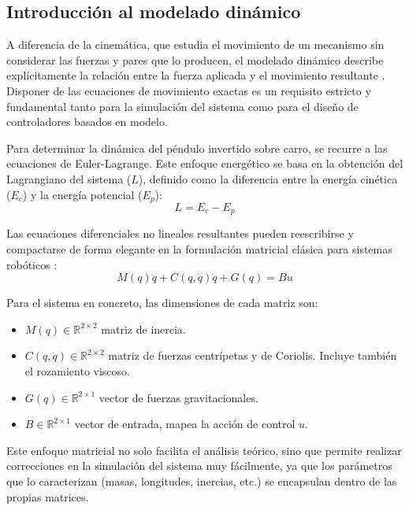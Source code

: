 \documentclass[11pt,fleqn]{book} %
\begin{document}
\subsection{Introducción al modelado dinámico}

A diferencia de la cinemática, que estudia el movimiento de un mecanismo sin considerar las fuerzas y pares que lo producen, el modelado dinámico describe explícitamente la relación entre la fuerza aplicada y el movimiento resultante \cite{spong2006robot}. Disponer de las ecuaciones de movimiento exactas es un requisito estricto y fundamental tanto para la simulación del sistema como para el diseño de controladores basados en modelo. 

Para determinar la dinámica del péndulo invertido sobre carro, se recurre a las ecuaciones de Euler-Lagrange. Este enfoque energético se basa en la obtención del Lagrangiano del sistema ($L$), definido como la diferencia entre la energía cinética ($E_c$) y la energía potencial ($E_p$):
\begin{equation}
		L = E_c - E_p
	\label{eq:lagrangiano}
\end{equation}

Las ecuaciones diferenciales no lineales resultantes pueden reescribirse y compactarse de forma elegante en la formulación matricial clásica para sistemas robóticos \cite{murray1994mathematical}:
\begin{equation}
		M(q)\ddot{q} + C(q,\dot{q})\dot{q} + G(q) = B u
	\label{eq:matrices_dinamica}
\end{equation}

Para el sistema en concreto, las dimensiones de cada matriz son:
\begin{itemize}
	\item $M(q) \in \mathbb{R}^{2 \times 2}$ matriz de inercia.
	\item $C(q,\dot{q}) \in \mathbb{R}^{2 \times 2}$ matriz de fuerzas centrípetas y de Coriolis. Incluye también el rozamiento viscoso.
	\item $G(q) \in \mathbb{R}^{2 \times 1}$ vector de fuerzas gravitacionales.
	\item $B \in \mathbb{R}^{2 \times 1}$ vector de entrada, mapea la acción de control $u$.
\end{itemize}

Este enfoque matricial no solo facilita el análisis teórico, sino que permite realizar correcciones en la simulación del sistema muy fácilmente, ya que los parámetros que lo caracterizan (masas, longitudes, inercias, etc.) se encapsulan dentro de las propias matrices.  
\end{document}
